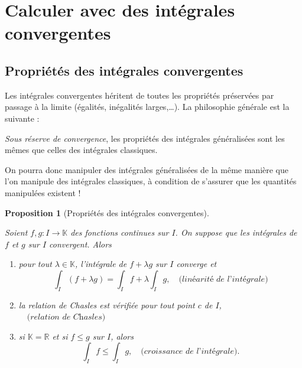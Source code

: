 \documentclass[
  french,
  letterpaper,
  DIV=11,
  numbers=noendperiod]{scrreprt}
\providecommand{\tightlist}{%
  \setlength{\itemsep}{0pt}\setlength{\parskip}{0pt}}
\theoremstyle{plain}
\theoremstyle{definition}
\theoremstyle{plain}
\newtheorem{proposition}{Proposition}[chapter]
\theoremstyle{plain}
\theoremstyle{definition}
\theoremstyle{definition}
\theoremstyle{plain}
\theoremstyle{remark}
\begin{document}
\section{Calculer avec des intégrales
convergentes}\label{sec-01-calculer}

\subsection{Propriétés des intégrales
convergentes}\label{propriuxe9tuxe9s-des-intuxe9grales-convergentes}

Les intégrales convergentes héritent de toutes les propriétés préservées
par passage à la limite (égalités, inégalités larges,\ldots). La
philosophie générale est la suivante :

\begin{tcolorbox}[enhanced jigsaw, arc=.35mm, bottomrule=.15mm, bottomtitle=1mm, breakable, colback=white, colbacktitle=quarto-callout-tip-color!10!white, colframe=quarto-callout-tip-color-frame, coltitle=black, left=2mm, leftrule=.75mm, opacityback=0, opacitybacktitle=0.6, rightrule=.15mm, title=\textcolor{quarto-callout-tip-color}{\faLightbulb}\hspace{0.5em}{Astuce}, titlerule=0mm, toprule=.15mm, toptitle=1mm]

\emph{Sous réserve de convergence}, les propriétés des intégrales
généralisées sont les mêmes que celles des intégrales classiques.

\end{tcolorbox}

On pourra donc manipuler des intégrales généralisées de la même manière
que l'on manipule des intégrales classiques, à condition de s'assurer
que les quantités manipulées existent !

\begin{proposition}[Propriétés des intégrales
convergentes]\protect\hypertarget{prp-proprietes-integrale-generalise}{}\label{prp-proprietes-integrale-generalise}

Soient \(f,g:I \to \mathbb{K}\) des fonctions continues sur \(I\). On
suppose que les intégrales de \(f\) et \(g\) sur \(I\)
\emph{convergent}. Alors

\begin{enumerate}
\def\labelenumi{\arabic{enumi}.}
\tightlist
\item
  pour tout \(\lambda \in \mathbb{K}\), l'intégrale de \(f+\lambda g\)
  sur \(I\) converge et
  \[ \int_I (f + \lambda g) = \int_I f + \lambda \int_I g, \quad
  \textit{(linéarité de l'intégrale)} \]
\item
  la \emph{relation de Chasles} est vérifiée pour tout point \(c\) de
  \(I\), \(\quad
  \textit{(relation de Chasles)}\)
\item
  si \(\mathbb{K}=\mathbb{R}\) et si \(f \leqslant g\) sur \(I\), alors
  \[ \int_I f
  \leqslant \int_I g, \quad \textit{(croissance de l'intégrale)}. \]
\end{enumerate}

\end{proposition}
\end{document}
